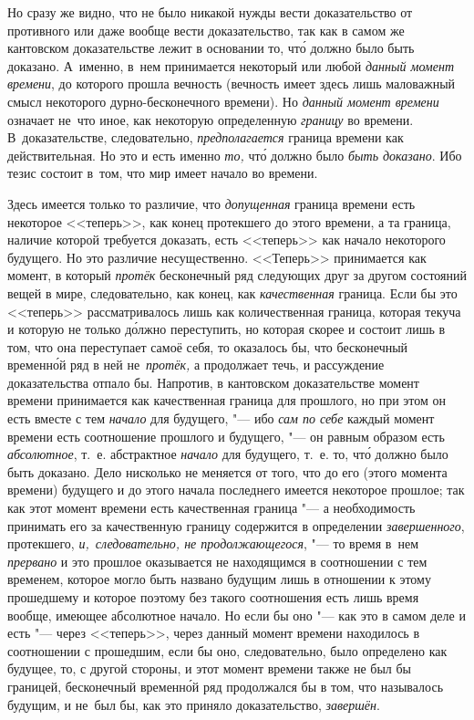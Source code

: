 Но сразу же видно, что не было никакой нужды вести доказательство от противного
или даже вообще вести доказательство, так как в самом же кантовском
доказательстве лежит в основании то, чт\'{о} должно было быть доказано. А~именно,
в~нем принимается некоторый или любой {\em данный момент времени}, до которого
прошла вечность (вечность имеет здесь лишь маловажный смысл некоторого
дурно-бесконечного времени). Но {\em данный момент времени} означает
не~что иное, как некоторую определенную {\em границу} во времени.
В~доказательстве, следовательно, {\em предполагается} граница времени как
действительная. Но это и есть именно {\em то,} чт\'{о} должно было
{\em быть доказано}. Ибо тезис состоит в~том, что мир имеет начало во времени.

Здесь имеется только то различие, что {\em допущенная} граница времени есть
некоторое <<теперь>>, как конец протекшего до этого времени, а та граница,
наличие которой требуется доказать, есть <<теперь>> как начало некоторого
будущего. Но это различие несущественно. <<Теперь>> принимается как момент,
в который {\em протёк} бесконечный ряд следующих друг за другом состояний вещей
в мире, следовательно, как конец, как {\em качественная} граница. Если бы это
<<теперь>> рассматривалось лишь как количественная граница, которая
текуча и которую не только д\'{о}лжно переступить, но которая скорее и
состоит лишь в том, что она переступает самоё себя, то оказалось бы, что бесконечный
временн\'{о}й ряд в ней не~{\em протёк,} а продолжает течь, и рассуждение
доказательства отпало бы. Напротив, в кантовском доказательстве момент времени
принимается как качественная граница для прошлого, но при этом он есть вместе
с тем {\em начало} для будущего, "--- ибо {\em сам по себе} каждый момент
времени есть соотношение прошлого и будущего, "--- он равным образом есть
{\em абсолютное}, т.~е. абстрактное {\em начало} для будущего, т.~е. то, чт\'{о}
должно было быть доказано. Дело нисколько не меняется от того, что до его
(этого момента времени) будущего и до этого начала последнего имеется некоторое
прошлое; так как этот момент времени есть качественная граница "--- а
необходимость принимать его за качественную границу содержится в определении
{\em завершенного}, протекшего, {\em и,~следовательно, не продолжающегося},
"--- то время в~нем {\em прервано} и это прошлое оказывается не находящимся
в соотношении с тем временем, которое могло быть названо будущим лишь в отношении
к этому прошедшему и которое поэтому без такого соотношения есть лишь время
вообще, имеющее абсолютное начало. Но если бы оно "--- как это в самом деле
и есть "--- через <<теперь>>, через данный момент времени находилось
в соотношении с прошедшим, если бы оно, следовательно, было определено как
будущее, то, с другой стороны, и этот момент времени также не был бы границей,
бесконечный временн\'{о}й ряд продолжался бы в том, что называлось будущим, и
не~был бы, как это приняло доказательство, {\em завершён}.


